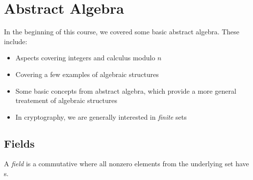 \section{Abstract Algebra}\label{sec:Abstract_Algebra}
In the beginning of this course, we covered some basic abstract algebra.
These include:
\begin{itemize}[noitemsep]
\item Aspects covering integers and calculus modulo $n$
\item Covering a few examples of algebraic structures
\item Some basic concepts from abstract algebra, which provide a more general treatement of algebraic structures
\item In cryptography, we are generally interested in \emph{finite} sets
\end{itemize}







\subsection{Fields}\label{subsec:Fields}
\begin{definition}[Field]\label{def:Field}
  A \emph{field} is a commutative  where all nonzero elements from the underlying set have s.
\end{definition}

